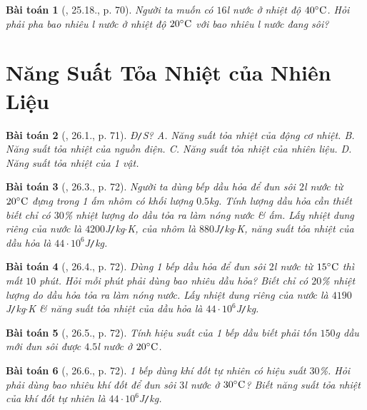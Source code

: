 \documentclass{article}
\newtheorem{baitoan}{Bài toán}
\begin{document}
\begin{baitoan}[\cite{SBT_Vat_Ly_8}, 25.18., p. 70]
	Người ta muốn có $16$\emph{l} nước ở nhiệt độ $40^\circ{\rm C}$. Hỏi phải pha bao nhiêu \emph{l} nước ở nhiệt độ $20^\circ{\rm C}$ với bao nhiêu \emph{l} nước đang sôi?
\end{baitoan}


\section{Năng Suất Tỏa Nhiệt của Nhiên Liệu}

\begin{baitoan}[\cite{SBT_Vat_Ly_8}, 26.1., p. 71]
	\emph{Đ\texttt{/}S?} {\sf A.} Năng suất tỏa nhiệt của động cơ nhiệt. {\sf B.} Năng suất tỏa nhiệt của nguồn điện. {\sf C.} Năng suất tỏa nhiệt của nhiên liệu. {\sf D.} Năng suất tỏa nhiệt của 1 vật.
\end{baitoan}

\begin{baitoan}[\cite{SBT_Vat_Ly_8}, 26.3., p. 72]
	Người ta dùng bếp dầu hỏa để đun sôi $2$\emph{l} nước từ $20^\circ{\rm C}$ đựng trong 1 ấm nhôm có khối lượng $0.5$\emph{kg}. Tính lượng dầu hỏa cần thiết biết chỉ có $30$\% nhiệt lượng do dầu tỏa ra làm nóng nước \& ấm. Lấy nhiệt dung riêng của nước là $4200$\emph{J\texttt{/}kg$\cdot$K}, của nhôm là $880$\emph{J\texttt{/}kg$\cdot$K}, năng suất tỏa nhiệt của dầu hỏa là $44\cdot10^6$\emph{J\texttt{/}kg}.
\end{baitoan}

\begin{baitoan}[\cite{SBT_Vat_Ly_8}, 26.4., p. 72]
	Dùng 1 bếp dầu hỏa để đun sôi $2$\emph{l} nước từ $15^\circ{\rm C}$ thì mất $10$ phút. Hỏi mỗi phút phải dùng bao nhiêu dầu hỏa? Biết chỉ có $20$\% nhiệt lượng do dầu hỏa tỏa ra làm nóng nước. Lấy nhiệt dung riêng của nước là $4190$\emph{J\texttt{/}kg$\cdot$K} \& năng suất tỏa nhiệt của dầu hỏa là $44\cdot10^6$\emph{J\texttt{/}kg}.
\end{baitoan}

\begin{baitoan}[\cite{SBT_Vat_Ly_8}, 26.5., p. 72]
	Tính hiệu suất của 1 bếp dầu biết phải tốn $150$\emph{g} dầu mới đun sôi được $4.5$\emph{l} nước ở $20^\circ{\rm C}$.
\end{baitoan}

\begin{baitoan}[\cite{SBT_Vat_Ly_8}, 26.6., p. 72]
	1 bếp dùng khí đốt tự nhiên có hiệu suất $30$\%. Hỏi phải dùng bao nhiêu khí đốt để đun sôi $3$\emph{l} nước ở $30^\circ{\rm C}$? Biết năng suất tỏa nhiệt của khí đốt tự nhiên là $44\cdot10^6$\emph{J\texttt{/}kg}.
\end{baitoan}
\end{document}

